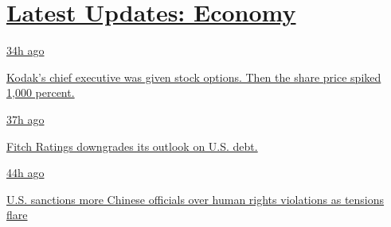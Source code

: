 \hypertarget{latest-updates-economy}{%
\section{\texorpdfstring{\href{https://www.nytimes.com/live/2020/07/31/business/stock-market-today-coronavirus?action=click\&pgtype=Article\&state=default\&region=MAIN_CONTENT_1\&context=storylines_live_updates}{Latest
Updates:
Economy}}{Latest Updates: Economy}}\label{latest-updates-economy}}

\href{https://www.nytimes.com/live/2020/07/31/business/stock-market-today-coronavirus?action=click\&pgtype=Article\&state=default\&region=MAIN_CONTENT_1\&context=storylines_live_updates\#kodaks-chief-executive-was-given-stock-options-then-the-share-price-spiked-1000-percent}{34h
ago}

\href{https://www.nytimes.com/live/2020/07/31/business/stock-market-today-coronavirus?action=click\&pgtype=Article\&state=default\&region=MAIN_CONTENT_1\&context=storylines_live_updates\#kodaks-chief-executive-was-given-stock-options-then-the-share-price-spiked-1000-percent}{Kodak's
chief executive was given stock options. Then the share price spiked
1,000 percent.}

\href{https://www.nytimes.com/live/2020/07/31/business/stock-market-today-coronavirus?action=click\&pgtype=Article\&state=default\&region=MAIN_CONTENT_1\&context=storylines_live_updates\#fitch-ratings-downgrades-its-outlook-on-us-debt}{37h
ago}

\href{https://www.nytimes.com/live/2020/07/31/business/stock-market-today-coronavirus?action=click\&pgtype=Article\&state=default\&region=MAIN_CONTENT_1\&context=storylines_live_updates\#fitch-ratings-downgrades-its-outlook-on-us-debt}{Fitch
Ratings downgrades its outlook on U.S. debt.}

\href{https://www.nytimes.com/live/2020/07/31/business/stock-market-today-coronavirus?action=click\&pgtype=Article\&state=default\&region=MAIN_CONTENT_1\&context=storylines_live_updates\#us-sanctions-more-chinese-officials-over-human-rights-violations-as-tensions-flare}{44h
ago}

\href{https://www.nytimes.com/live/2020/07/31/business/stock-market-today-coronavirus?action=click\&pgtype=Article\&state=default\&region=MAIN_CONTENT_1\&context=storylines_live_updates\#us-sanctions-more-chinese-officials-over-human-rights-violations-as-tensions-flare}{U.S.
sanctions more Chinese officials over human rights violations as
tensions flare}


